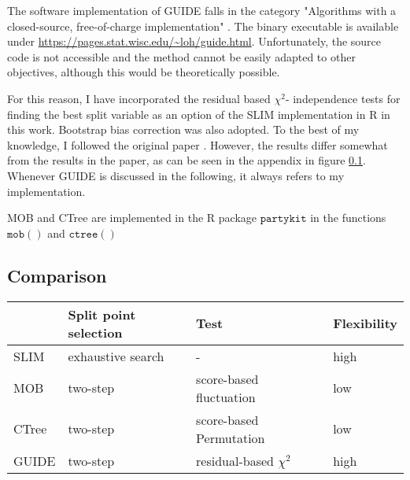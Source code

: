 The software implementation of GUIDE falls in the category "Algorithms with a closed-source, free-of-charge implementation" \citep{Loh.2014}. The binary executable is available under \url{https://pages.stat.wisc.edu/~loh/guide.html}.  Unfortunately, the source code is not accessible and the method cannot be easily adapted to other objectives, although this would be theoretically possible.

For this reason, I have incorporated the residual based $\chi^2$- independence tests for finding the best split variable as an option of the SLIM implementation in R  in this work. Bootstrap bias correction was also adopted. To the best of my knowledge, I followed the original paper \citep{Loh.2002}. However, the results differ somewhat from the results in the paper, as can be seen in the appendix in figure \ref{}. 
Whenever GUIDE is discussed in the following, it always refers to my implementation. 

MOB and CTree are implemented in the R package $\mathtt{partykit}$ \citep{Hothorn.2015} in the functions $\mathtt{mob()}$ \citep{Zeileis.2008} and $\mathtt{ctree()}$ \citep{Hothorn.2006}




\subsection{Comparison}
\begin{table}[ht]
\centering
\begin{tabular}{llll}
  \hline
 & Split point selection & Test & Flexibility  \\ 
  \hline
    SLIM & exhaustive search & - & high  \\ 
    MOB & two-step & score-based fluctuation & low \\ 
    CTree & two-step & score-based Permutation & low \\ 
    GUIDE & two-step & residual-based $\chi^2$  & high \\ 
   \hline
\end{tabular}
\end{table}



